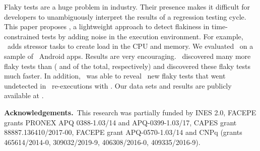 \documentclass[conference]{IEEEtran}
\begin{document}
Flaky tests are a huge problem in industry. Their presence makes it difficult for developers to unambiguously interpret the results of a regression testing cycle. This paper proposes \tname, a lightweight approach to detect flakiness in time-constrained tests by adding noise in the execution environment. For example, \tname\ adds stressor tasks to create load in the CPU and memory. We evaluated \tname\ on a sample of \numprojects\ Android apps. Results are very encouraging. \tname\ discovered many more flaky tests than \rerun{} (\percFlakyDetectedShaker{} and \percFlakyDetectedReRun{} of the total, respectively) and discovered these flaky tests much faster. In addition, \tname\ was able to reveal \numTotalNewFlaky\ new flaky tests that went undetected in \numRandomConfigs\ re-executions with \rerun. Our data sets and results are publicly available at \artifactUrl.

{\small
\noindent\textbf{Acknowledgements.}~This research was partially funded by INES 2.0, FACEPE grants PRONEX APQ 0388-1.03/14 and APQ-0399-1.03/17, CAPES grant 88887.136410/2017-00, FACEPE grant APQ-0570-1.03/14 and CNPq (grants 465614/2014-0, 309032/2019-9, 406308/2016-0, 409335/2016-9).
}

{}


    
\end{document}
